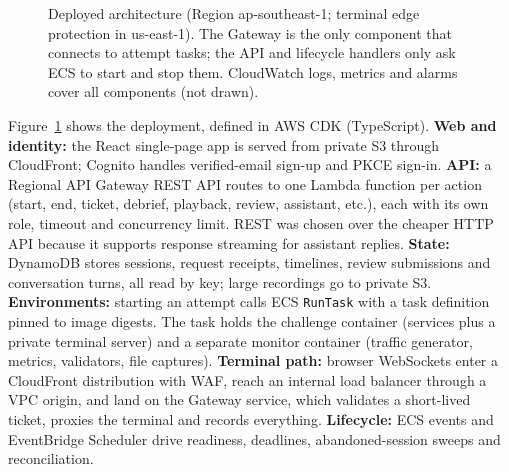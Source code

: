 \documentclass[11pt,a4paper]{article}
\begin{document}
\begin{figure}[ht]
\caption{Deployed architecture (Region ap-southeast-1; terminal edge protection
in us-east-1). The Gateway is the only component that connects to attempt tasks;
the API and lifecycle handlers only ask ECS to start and stop them.
CloudWatch logs, metrics and alarms cover all components (not drawn).}
\label{fig:arch}
\end{figure}
Figure~\ref{fig:arch} shows the deployment, defined in AWS CDK (TypeScript).
\textbf{Web and identity:} the React single-page app is served from private S3
through CloudFront; Cognito handles verified-email sign-up and PKCE sign-in.
\textbf{API:} a Regional API Gateway REST API routes to one Lambda function per
action (start, end, ticket, debrief, playback, review, assistant, etc.), each
with its own role, timeout and concurrency limit. REST was chosen over the
cheaper HTTP API because it supports response streaming for assistant replies.
\textbf{State:} DynamoDB stores sessions, request receipts, timelines, review
submissions and conversation turns, all read by key; large recordings go to
private S3. \textbf{Environments:} starting an attempt calls ECS
\texttt{RunTask} with a task definition pinned to image digests. The task holds
the challenge container (services plus a private terminal server) and a separate
monitor container (traffic generator, metrics, validators, file captures).
\textbf{Terminal path:} browser WebSockets enter a CloudFront distribution
with WAF, reach an internal load balancer through a VPC origin, and land on the
Gateway service, which validates a short-lived ticket, proxies the terminal and
records everything. \textbf{Lifecycle:} ECS events and EventBridge Scheduler
drive readiness, deadlines, abandoned-session sweeps and reconciliation.
\end{document}
